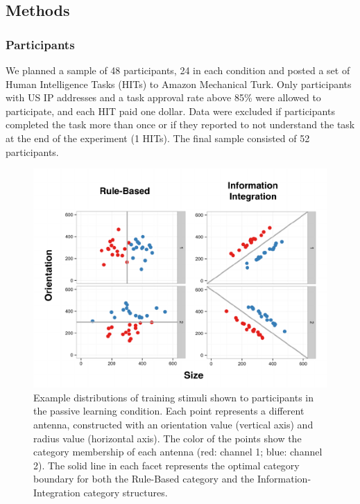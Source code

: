 \documentclass[10pt, letterpaper]{article}
\newenvironment{CodeChunk}{}{}
\begin{document}
\subsection{Methods}\label{methods}

\subsubsection{Participants}\label{participants}

We planned a sample of 48 participants, 24 in each condition and posted
a set of Human Intelligence Tasks (HITs) to Amazon Mechanical Turk. Only
participants with US IP addresses and a task approval rate above 85\%
were allowed to participate, and each HIT paid one dollar. Data were
excluded if participants completed the task more than once or if they
reported to not understand the task at the end of the experiment (1
HITs). The final sample consisted of 52 participants.

\begin{CodeChunk}
\begin{figure}[t]

{\centering \includegraphics{figs/category_exp1-1} 

}

\caption[Example distributions of training stimuli shown to participants in the passive learning condition]{Example distributions of training stimuli shown to participants in the passive learning condition. Each point represents a different antenna, constructed with an orientation value (vertical axis) and radius value (horizontal axis). The color of the points show the category membership of each antenna (red: channel 1; blue: channel 2). The solid line in each facet represents the optimal category boundary for both the Rule-Based category and the Information-Integration category structures.}\label{fig:category_exp1}
\end{figure}
\end{CodeChunk}
\end{document}

